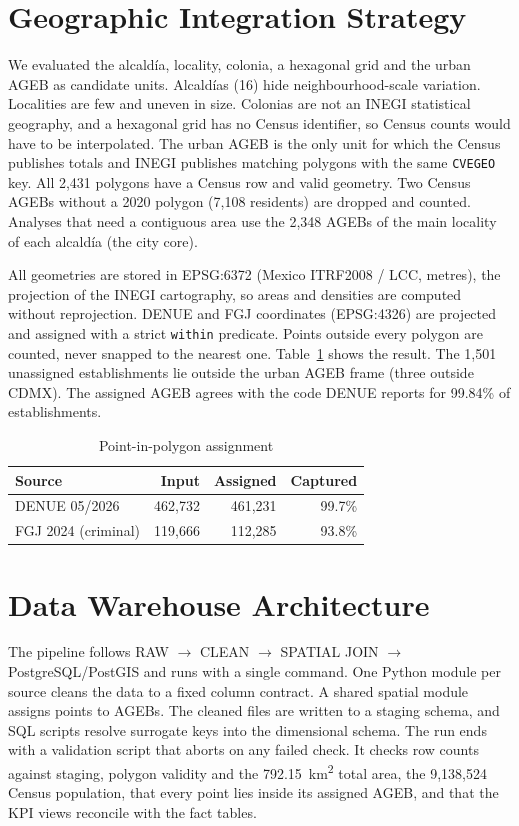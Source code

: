 \documentclass[peerreviewca]{IEEEtran}
\begin{document}
\section{Geographic Integration Strategy}

We evaluated the alcald\'ia, locality, colonia, a hexagonal grid and the urban AGEB as candidate units. Alcald\'ias (16) hide neighbourhood-scale variation. Localities are few and uneven in size. Colonias are not an INEGI statistical geography, and a hexagonal grid has no Census identifier, so Census counts would have to be interpolated. The urban AGEB is the only unit for which the Census publishes totals and INEGI publishes matching polygons with the same \texttt{CVEGEO} key. All 2,431 polygons have a Census row and valid geometry. Two Census AGEBs without a 2020 polygon (7,108 residents) are dropped and counted. Analyses that need a contiguous area use the 2,348 AGEBs of the main locality of each alcald\'ia (the city core).

All geometries are stored in EPSG:6372 (Mexico ITRF2008 / LCC, metres), the projection of the INEGI cartography, so areas and densities are computed without reprojection. DENUE and FGJ coordinates (EPSG:4326) are projected and assigned with a strict \texttt{within} predicate. Points outside every polygon are counted, never snapped to the nearest one. Table~\ref{tab:join} shows the result. The 1,501 unassigned establishments lie outside the urban AGEB frame (three outside CDMX). The assigned AGEB agrees with the code DENUE reports for 99.84\% of establishments.

\begin{table}[htbp]
\caption{Point-in-polygon assignment}
\label{tab:join}
\centering
\begin{tabular}{@{}lrrr@{}}
\toprule
Source & Input & Assigned & Captured \\
\midrule
DENUE 05/2026 & 462,732 & 461,231 & 99.7\% \\
FGJ 2024 (criminal) & 119,666 & 112,285 & 93.8\% \\
\bottomrule
\end{tabular}
\end{table}

\section{Data Warehouse Architecture}

The pipeline follows RAW $\rightarrow$ CLEAN $\rightarrow$ SPATIAL JOIN $\rightarrow$ PostgreSQL/PostGIS and runs with a single command. One Python module per source cleans the data to a fixed column contract. A shared spatial module assigns points to AGEBs. The cleaned files are written to a staging schema, and SQL scripts resolve surrogate keys into the dimensional schema. The run ends with a validation script that aborts on any failed check. It checks row counts against staging, polygon validity and the 792.15~km\textsuperscript{2} total area, the 9,138,524 Census population, that every point lies inside its assigned AGEB, and that the KPI views reconcile with the fact tables.
\end{document}
